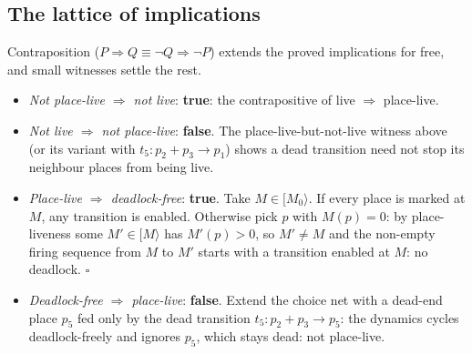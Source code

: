 \subsection{The lattice of implications}

Contraposition ($P \Rightarrow Q \equiv \neg Q \Rightarrow \neg P$) extends the proved implications for free, and small witnesses settle the rest.
\begin{itemize}
  \item \emph{Not place-live $\Rightarrow$ not live}: \textbf{true}: the contrapositive of live $\Rightarrow$ place-live.
  \item \emph{Not live $\Rightarrow$ not place-live}: \textbf{false}. The place-live-but-not-live witness above (or its variant with $t_5 : p_2 + p_3 \to p_1$) shows a dead transition need not stop its neighbour places from being live.
\begin{center}
\end{center}
  \item \emph{Place-live $\Rightarrow$ deadlock-free}: \textbf{true}. Take $M \in [M_0\rangle$. If every place is marked at $M$, any transition is enabled. Otherwise pick $p$ with $M(p) = 0$: by place-liveness some $M' \in [M\rangle$ has $M'(p) > 0$, so $M' \neq M$ and the non-empty firing sequence from $M$ to $M'$ starts with a transition enabled at $M$: no deadlock. $\square$
  \item \emph{Deadlock-free $\Rightarrow$ place-live}: \textbf{false}. Extend the choice net with a dead-end place $p_5$ fed only by the dead transition $t_5 : p_2 + p_3 \to p_5$: the dynamics cycles deadlock-freely and ignores $p_5$, which stays dead: not place-live.
\end{itemize}

